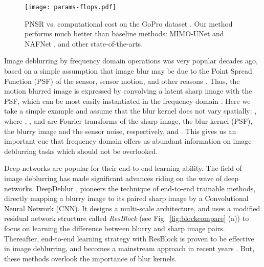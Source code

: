 \documentclass[letterpaper]{article} \usepackage{aaai23}  \usepackage{times}  \usepackage{helvet}  \usepackage{courier}  \usepackage[hyphens]{url}  \usepackage{graphicx} \usepackage{enumitem}
\begin{document}
\begin{figure}[t]
\begin{center}
    \texttt{[image: params-flops.pdf]}
\end{center}
\caption{PNSR vs. computational cost on the GoPro dataset \cite{Nah2017deep}. Our method performs much better than baseline methods: MIMO-UNet \cite{Cho2021rethinking} and NAFNet \cite{Chen2022simple}, and other state-of-the-arts. } 
\label{fig:glance}
\end{figure}

Image deblurring by frequency domain operations was very popular decades ago, based on a simple assumption that image blur may be due to the Point Spread Function (PSF) of the sensor, sensor motion, and other reasons \cite{Benham1997digital}.  
Thus, the motion blurred image is expressed by convolving a latent sharp image with the PSF, which can be most easily instantiated in the frequency domain \cite{Chakrabarti2010analyzing,Xu2013unnatural,Hu2014deblurring,Pan2016blind}. Here we take a simple example and assume that the blur kernel does not vary spatially:  
,
where , ,  and  are Fourier transforms of the sharp image, the blur kernel (PSF), the blurry image and the sensor noise, respectively, and .  This gives us an important cue that frequency domain offers us abundant information on image deblurring tasks which should not be overlooked.

Deep networks are popular for their end-to-end learning ability. The field of image deblurring has made significant advances riding on the wave of deep networks. DeepDeblur \cite{Nah2017deep}, pioneers the technique of end-to-end trainable methods, directly mapping a blurry image to its paired sharp image by a {C}onvolutional {N}eural {N}etwork (CNN). It designs a multi-scale architecture, and uses a modified residual network structure \cite{He2016deep} called \textit{ResBlock} (see Fig.~\ref{fig:blockcompare} (a)) to focus on learning the difference between blurry and sharp image pairs.
Thereafter, end-to-end learning strategy with ResBlock is proven to be effective in image deblurring, and becomes a mainstream approach in recent years \cite{Tao2018scale,Zhang2019deep,HongyunGao2019DynamicSD,HongguangZhang2019DeepSH,Park2020multi,YuanYuan2020EfficientDS,Zamir2021multi,Chen2021hinet,Zou2021sdwnet,KuldeepPurohit2021SpatiallyAdaptiveIR,Cho2021rethinking,Chen2022simple}. But, these methods overlook the importance of blur kernels.
\end{document}
